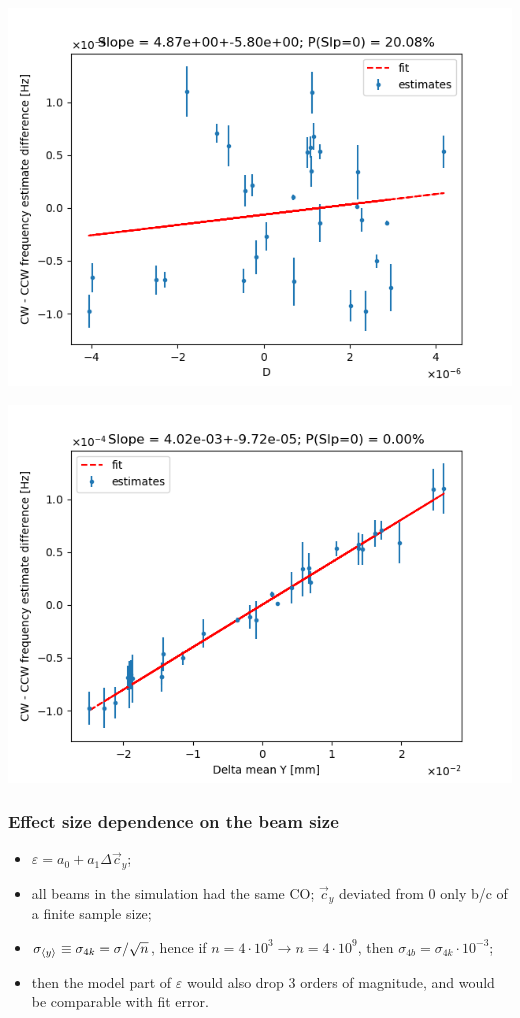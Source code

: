 \documentclass{beamer}
\begin{document}
\begin{frame}
  \vspace*{-.1cm}
  \includegraphics[height=.5\paperheight]{img/spin_axis_motion/multiple/freq_estimates_vs_centroid_diff_D}\\
  \vspace*{-.3cm}
  \begin{flushright}
    \includegraphics[height=.5\paperheight]{img/spin_axis_motion/multiple/freq_estimates_vs_centroid_diff_Y}
  \end{flushright}
\end{frame}

\begin{frame}
  \frametitle{Effect size dependence on the beam size}
  \begin{itemize}
  \item $\varepsilon = a_0 + a_1\Delta \vec c_y$;
  \item all beams in the simulation had the same CO; $\vec c_y$ deviated from 0 only b/c of a finite sample size;
  \item $\sigma_{\avg{y}}\equiv \sigma_{4k} = \sigma/\sqrt{n}$, hence if $n = 4\cdot 10^3 \rightarrow n=4\cdot 10^9$, then $\sigma_{4b} = \sigma_{4k}\cdot 10^{-3}$;
  \item then the model part of $\varepsilon$ would also drop 3 orders of magnitude, and would be comparable with fit error.
  \end{itemize}
\end{frame}
\end{document}
